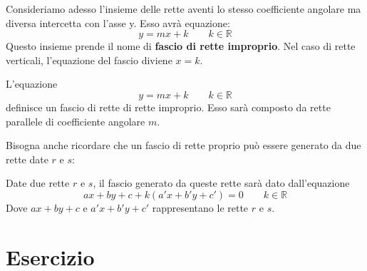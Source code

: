 \documentclass[10pt,a4paper]{article}
\begin{document}
	Consideriamo adesso l'insieme delle rette aventi lo stesso coefficiente angolare ma diversa intercetta con l'asse y. Esso avrà equazione:
	\begin{equation*}
		y = mx + k		\qquad	k \in \mathbb{R}
	\end{equation*}
	Questo insieme prende il nome di \textbf{fascio di rette improprio}. Nel caso di rette verticali, l'equazione del fascio diviene $x = k$.
	
	\begin{definition}
	L'equazione 
		\begin{equation*}
			y = mx + k \qquad k \in \mathbb{R}
		\end{equation*}
	definisce un fascio di rette di rette improprio. Esso sarà composto da  rette parallele di coefficiente angolare $m$. 
	
	
	\end{definition}

\begin{center}
\end{center} 

Bisogna anche ricordare che un fascio di rette proprio può essere generato da due rette date $r$ e $s$:
	\begin{definition}
		Date due rette $r$ e $s$, il fascio generato da queste rette sarà dato dall'equazione 
		\begin{equation*}
			ax + by + c + k(a'x + b'y + c')= 0	\qquad	k \in \mathbb{R}
		\end{equation*}
		Dove $ax + by + c$ e $a'x + b'y + c'$ rappresentano le rette $r$ e $s$.
	\end{definition}

\section{Esercizio}
\end{document}
